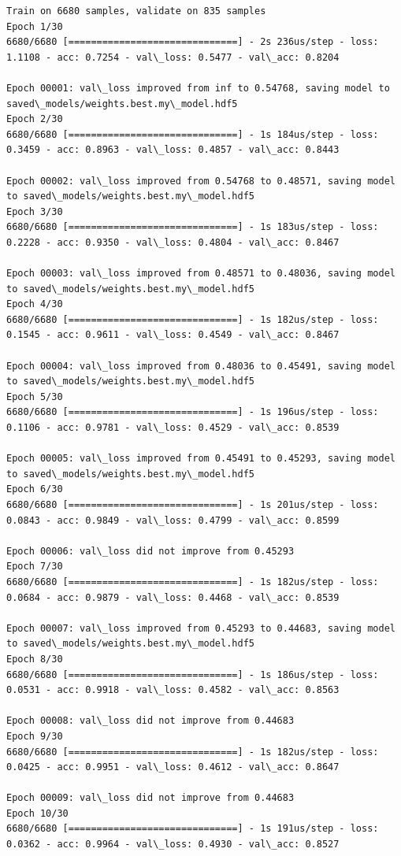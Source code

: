 \documentclass[11pt]{article}
\begin{document}
    \begin{Verbatim}[commandchars=\\\{\}]
Train on 6680 samples, validate on 835 samples
Epoch 1/30
6680/6680 [==============================] - 2s 236us/step - loss: 1.1108 - acc: 0.7254 - val\_loss: 0.5477 - val\_acc: 0.8204

Epoch 00001: val\_loss improved from inf to 0.54768, saving model to saved\_models/weights.best.my\_model.hdf5
Epoch 2/30
6680/6680 [==============================] - 1s 184us/step - loss: 0.3459 - acc: 0.8963 - val\_loss: 0.4857 - val\_acc: 0.8443

Epoch 00002: val\_loss improved from 0.54768 to 0.48571, saving model to saved\_models/weights.best.my\_model.hdf5
Epoch 3/30
6680/6680 [==============================] - 1s 183us/step - loss: 0.2228 - acc: 0.9350 - val\_loss: 0.4804 - val\_acc: 0.8467

Epoch 00003: val\_loss improved from 0.48571 to 0.48036, saving model to saved\_models/weights.best.my\_model.hdf5
Epoch 4/30
6680/6680 [==============================] - 1s 182us/step - loss: 0.1545 - acc: 0.9611 - val\_loss: 0.4549 - val\_acc: 0.8467

Epoch 00004: val\_loss improved from 0.48036 to 0.45491, saving model to saved\_models/weights.best.my\_model.hdf5
Epoch 5/30
6680/6680 [==============================] - 1s 196us/step - loss: 0.1106 - acc: 0.9781 - val\_loss: 0.4529 - val\_acc: 0.8539

Epoch 00005: val\_loss improved from 0.45491 to 0.45293, saving model to saved\_models/weights.best.my\_model.hdf5
Epoch 6/30
6680/6680 [==============================] - 1s 201us/step - loss: 0.0843 - acc: 0.9849 - val\_loss: 0.4799 - val\_acc: 0.8599

Epoch 00006: val\_loss did not improve from 0.45293
Epoch 7/30
6680/6680 [==============================] - 1s 182us/step - loss: 0.0684 - acc: 0.9879 - val\_loss: 0.4468 - val\_acc: 0.8539

Epoch 00007: val\_loss improved from 0.45293 to 0.44683, saving model to saved\_models/weights.best.my\_model.hdf5
Epoch 8/30
6680/6680 [==============================] - 1s 186us/step - loss: 0.0531 - acc: 0.9918 - val\_loss: 0.4582 - val\_acc: 0.8563

Epoch 00008: val\_loss did not improve from 0.44683
Epoch 9/30
6680/6680 [==============================] - 1s 182us/step - loss: 0.0425 - acc: 0.9951 - val\_loss: 0.4612 - val\_acc: 0.8647

Epoch 00009: val\_loss did not improve from 0.44683
Epoch 10/30
6680/6680 [==============================] - 1s 191us/step - loss: 0.0362 - acc: 0.9964 - val\_loss: 0.4930 - val\_acc: 0.8527


\end{Verbatim}
\end{document}
